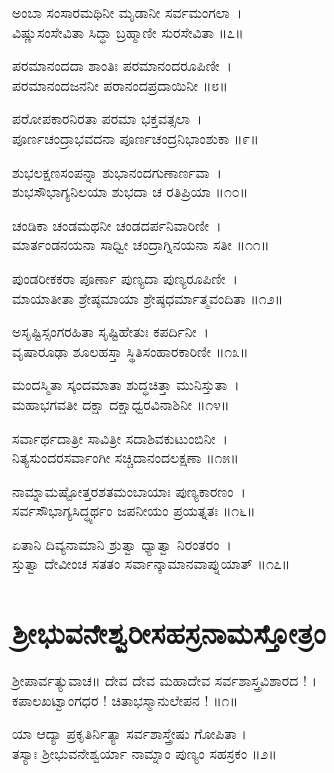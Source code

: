 ಅಂಬಾ ಸಂಸಾರಮಥಿನೀ ಮೃಡಾನೀ ಸರ್ವಮಂಗಲಾ~।\\
ವಿಷ್ಣುಸಂಸೇವಿತಾ ಸಿದ್ಧಾ ಬ್ರಹ್ಮಾಣೀ ಸುರಸೇವಿತಾ ॥೭॥

ಪರಮಾನಂದದಾ ಶಾಂತಿಃ ಪರಮಾನಂದರೂಪಿಣೀ~।\\
ಪರಮಾನಂದಜನನೀ ಪರಾನಂದಪ್ರದಾಯಿನೀ ॥೮॥

ಪರೋಪಕಾರನಿರತಾ ಪರಮಾ ಭಕ್ತವತ್ಸಲಾ~।\\
ಪೂರ್ಣಚಂದ್ರಾಭವದನಾ ಪೂರ್ಣಚಂದ್ರನಿಭಾಂಶುಕಾ ॥೯॥

ಶುಭಲಕ್ಷಣಸಂಪನ್ನಾ ಶುಭಾನಂದಗುಣಾರ್ಣವಾ~।\\
ಶುಭಸೌಭಾಗ್ಯನಿಲಯಾ ಶುಭದಾ ಚ ರತಿಪ್ರಿಯಾ ॥೧೦॥

ಚಂಡಿಕಾ ಚಂಡಮಥನೀ ಚಂಡದರ್ಪನಿವಾರಿಣೀ~।\\
ಮಾರ್ತಂಡನಯನಾ ಸಾಧ್ವೀ ಚಂದ್ರಾಗ್ನಿನಯನಾ ಸತೀ ॥೧೧॥

ಪುಂಡರೀಕಕರಾ ಪೂರ್ಣಾ ಪುಣ್ಯದಾ ಪುಣ್ಯರೂಪಿಣೀ~।\\
ಮಾಯಾತೀತಾ ಶ್ರೇಷ್ಠಮಾಯಾ ಶ್ರೇಷ್ಠಧರ್ಮಾತ್ಮವಂದಿತಾ ॥೧೨॥

ಅಸೃಷ್ಟಿಸ್ಸಂಗರಹಿತಾ ಸೃಷ್ಟಿಹೇತುಃ ಕಪರ್ದಿನೀ~।\\
ವೃಷಾರೂಢಾ ಶೂಲಹಸ್ತಾ ಸ್ಥಿತಿಸಂಹಾರಕಾರಿಣೀ ॥೧೩॥

ಮಂದಸ್ಮಿತಾ ಸ್ಕಂದಮಾತಾ ಶುದ್ಧಚಿತ್ತಾ ಮುನಿಸ್ತುತಾ~।\\
ಮಹಾಭಗವತೀ ದಕ್ಷಾ ದಕ್ಷಾಧ್ವರವಿನಾಶಿನೀ ॥೧೪॥

ಸರ್ವಾರ್ಥದಾತ್ರೀ ಸಾವಿತ್ರೀ ಸದಾಶಿವಕುಟುಂಬಿನೀ~।\\
ನಿತ್ಯಸುಂದರಸರ್ವಾಂಗೀ ಸಚ್ಚಿದಾನಂದಲಕ್ಷಣಾ ॥೧೫॥

ನಾಮ್ನಾಮಷ್ಟೋತ್ತರಶತಮಂಬಾಯಾಃ ಪುಣ್ಯಕಾರಣಂ~।\\
ಸರ್ವಸೌಭಾಗ್ಯಸಿದ್ಧ್ಯರ್ಥಂ ಜಪನೀಯಂ ಪ್ರಯತ್ನತಃ ॥೧೬॥

ಏತಾನಿ ದಿವ್ಯನಾಮಾನಿ ಶ್ರುತ್ವಾ ಧ್ಯಾತ್ವಾ ನಿರಂತರಂ~।\\
ಸ್ತುತ್ವಾ ದೇವೀಂಚ ಸತತಂ ಸರ್ವಾನ್ಕಾಮಾನವಾಪ್ನುಯಾತ್ ॥೧೭॥



\section{ಶ್ರೀಭುವನೇಶ್ವರೀಸಹಸ್ರನಾಮಸ್ತೋತ್ರಂ}

 ಶ್ರೀಪಾರ್ವತ್ಯುವಾಚ॥
ದೇವ ದೇವ ಮಹಾದೇವ ಸರ್ವಶಾಸ್ತ್ರವಿಶಾರದ ! ।\\
ಕಪಾಲಖಟ್ವಾಂಗಧರ ! ಚಿತಾಭಸ್ಮಾನುಲೇಪನ ! ॥೧॥

ಯಾ ಆದ್ಯಾ ಪ್ರಕೃತಿರ್ನಿತ್ಯಾ ಸರ್ವಶಾಸ್ತ್ರೇಷು ಗೋಪಿತಾ ।\\
ತಸ್ಯಾಃ ಶ್ರೀಭುವನೇಶ್ವರ್ಯಾ ನಾಮ್ನಾಂ ಪುಣ್ಯಂ ಸಹಸ್ರಕಂ ॥೨॥


